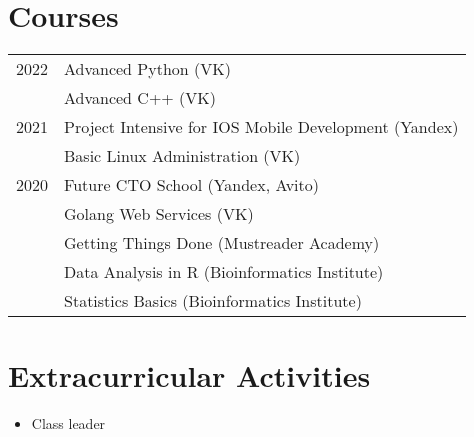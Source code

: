 \section{Courses}
\begin{tabular}{rl}

\textsc{2022}  & Advanced Python  \footnotesize(VK)\normalsize\\
\textsc{}  & Advanced C++ \footnotesize(VK)\normalsize\\
\textsc{2021}  & Project Intensive for IOS Mobile Development \footnotesize(Yandex)\normalsize\\
\textsc{}  & Basic Linux Administration \footnotesize(VK)\normalsize\\

\textsc{2020}  & Future CTO School \footnotesize(Yandex, Avito)\normalsize\\
\textsc{}  & Golang Web Services \footnotesize(VK)\normalsize\\
\textsc{}  & Getting Things Done \footnotesize(Mustreader Academy)\normalsize\\
\textsc{}  & Data Analysis in R \footnotesize(Bioinformatics Institute)\normalsize\\
\textsc{}  & Statistics Basics \footnotesize(Bioinformatics Institute)\normalsize\\

\end{tabular}

\section{Extracurricular Activities}
\begin{itemize}
\item Class leader
\end{itemize}





